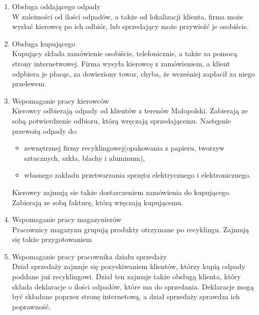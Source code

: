 

\begin{enumerate}
	\item Obsługa oddającego odpady \\
	W zależności od ilości odpadów, a także od lokalizacji klienta, firma może wysłać kierowcę po ich odbiór, lub sprzedający może przywieźć je osobiście.
	\item Obsługa kupującego \\
	Kupujący składa zamówienie osobiście, telefonicznie, a także za pomocą strony internetwowej. Firma wysyła kierowcę z zamówieniem, a klient odpbiera je płacąc, za dowieziony towar, chyba, że wcześniej zapłacił za niego przelewem.
	\item Wspomaganie pracy kierowców \\
	Kierowcy odbierają odpady od klientów z terenów Małopolski. Zabierają ze sobą potwierdzenie odbioru, którą wręczają sprzedającemu. Następnie przewożą odpady do:
		\begin{itemize}
			\item zewnętrznej firmy recyklingowej(opakowania z papieru, tworzyw sztucznych, szkła, blachy i aluminum),
			\item własnego zakładu przetwarzania sprzętu elektrycznego i elektronicznego.
		\end{itemize}
	Kierowcy zajmują sie także dostarczeniem zamówienia do kupującego. Zabierają ze sobą fakturę, którą wręczają kupującemu.
	\item Wspomaganie pracy magazynierów \\
	Pracownicy magazynu grupują produkty otrzymane po recyklingu. Zajmują się także przygotowaniem 
	\item Wspomaganie pracy pracownika działu sprzedaży \\
	Dział sprzedaży zajmuje się pozyskiwaniem klientów, którzy kupią odpady poddane już recyklingowi. Dział ten zajmuje także obsługą klienta, który składa deklaracje o ilości odpadów, które ma do sprzedania. Deklaracje mogą być składane poprzez stronę internetową, a dział sprzedaży sprawdza ich poprawność.
\end{enumerate}
